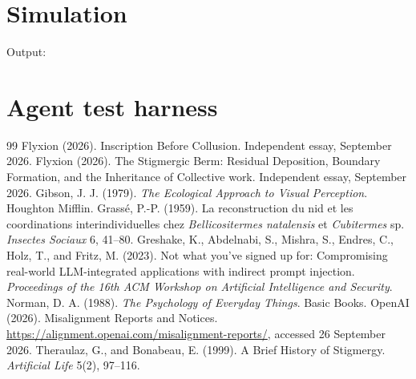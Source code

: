 \documentclass[11pt]{article}
\begin{document}
\section{Simulation}\label{app:sim}

\noindent Output:


\section{Agent test harness}\label{app:harness}


\clearpage
\begingroup
\raggedright
\begin{thebibliography}{99}
 Flyxion (2026). Inscription Before Collusion. Independent essay, September 2026.
 Flyxion (2026). The Stigmergic Berm: Residual Deposition, Boundary Formation, and the Inheritance of Collective work. Independent essay, September 2026.
 Gibson, J. J. (1979). \emph{The Ecological Approach to Visual Perception}. Houghton Mifflin.
 Grass\'e, P.-P. (1959). La reconstruction du nid et les coordinations interindividuelles chez \emph{Bellicositermes natalensis} et \emph{Cubitermes} sp. \emph{Insectes Sociaux} 6, 41--80.
 Greshake, K., Abdelnabi, S., Mishra, S., Endres, C., Holz, T., and Fritz, M. (2023). Not what you've signed up for: Compromising real-world LLM-integrated applications with indirect prompt injection. \emph{Proceedings of the 16th ACM Workshop on Artificial Intelligence and Security}.
 Norman, D. A. (1988). \emph{The Psychology of Everyday Things}. Basic Books.
 OpenAI (2026). Misalignment Reports and Notices. \url{https://alignment.openai.com/misalignment-reports/}, accessed 26 September 2026.
 Theraulaz, G., and Bonabeau, E. (1999). A Brief History of Stigmergy. \emph{Artificial Life} 5(2), 97--116.
\end{thebibliography}
\endgroup
\end{document}
